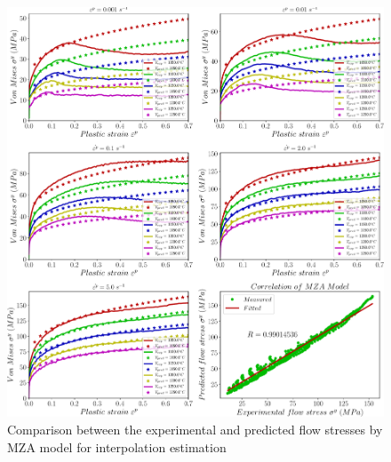 \documentclass[twoside,english,1p,final,sort&compress]{elsarticle}
\theoremstyle{plain}
\begin{document}
\begin{table}[h!]
\centering{}
\caption{Parameters' constants of Modified--Zerrilli-Armstrong Model}
\end{table}
\begin{figure}[!ht]
\centering
\includegraphics[width=1.02\columnwidth]
{newFigures/iCorrelationMZA}
\caption{Comparison between the experimental and predicted flow stresses by MZA model for interpolation estimation}
\label{fig:iCorrelationMZA}
\end{figure}
\end{document}
